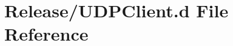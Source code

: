 \hypertarget{Release_2UDPClient_8d}{}\section{Release/\+U\+D\+P\+Client.d File Reference}
\label{Release_2UDPClient_8d}
